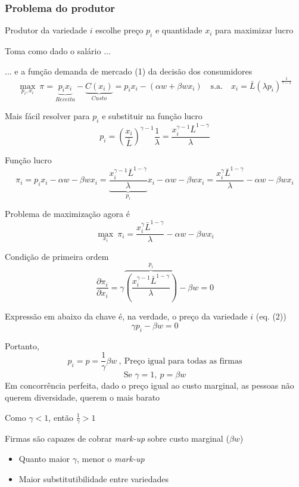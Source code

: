 \documentclass[a4paper,12pt]{article}[abntex2]
\begin{document}
\subsubsection{\textbf{Problema do produtor}}
Produtor da variedade \(i\) escolhe preço \(p_i\) e quantidade \(x_i\) para maximizar lucro

Toma como dado o salário ...

... e a função demanda de mercado (1) da decisão dos consumidores
\[
\max_{p_i, x_i} \ \pi = \underbrace{p_i x_i}_{Receita} - \underbrace{C(x_i)}_{Custo} = p_i x_i - (\alpha w + \beta w x_i)
\quad \text{s.a.} \quad x_i = \bar{L} (\lambda p_i)^{\frac{1}{\gamma - 1}}
\]

Mais fácil resolver para \(p_i\) e substituir na função lucro
\[
p_i = \left( \frac{x_i}{\bar{L}} \right)^{\gamma - 1} \frac{1}{\lambda} = \frac{x_i^{\gamma - 1} \bar{L}^{1 - \gamma}}{\lambda} \tag{2}
\]

Função lucro
\[
\pi_i = p_i x_i - \alpha w - \beta w x_i = \underbrace{\frac{x_i^{\gamma-1} \bar{L}^{1 - \gamma}}{\lambda}}_{p_i}x_i - \alpha w - \beta w x_i=\frac{x_i^{\gamma} \bar{L}^{1 - \gamma}}{\lambda}- \alpha w - \beta w x_i
\]

Problema de maximização agora é
\[
\max_{x_i} \ \pi_i = \frac{x_i^{\gamma} \bar{L}^{1 - \gamma}}{\lambda} - \alpha w - \beta w x_i
\]

Condição de primeira ordem
\[
\frac{\partial \pi_i}{\partial x_i} = \gamma \overbrace {\left( \frac{x_i^{\gamma - 1} \bar{L}^{1 - \gamma}}{\lambda}\right)}^{p_i} - \beta w = 0
\]

Expressão em abaixo da chave é, na verdade, o preço da variedade \(i\) (eq. (2))
\[
\gamma p_i - \beta w = 0
\]

Portanto,
\[
p_i = p = \frac{1}{\gamma} \beta w \tag{3} \ , \ \text{Preço igual para todas as firmas}
\]
\[
\text{Se \(\gamma=1\)}, \ p=\beta w
\]
Em concorrência perfeita, dado o preço igual ao custo marginal, as pessoas não querem diversidade, querem o mais barato

Como \(\gamma < 1\), então \(\frac{1}{\gamma} > 1\)

Firmas são capazes de cobrar \textit{mark-up} sobre custo marginal (\(\beta w\))
\begin{itemize}
    \item Quanto maior \(\gamma\), menor o \textit{mark-up}
    \item Maior substitutibilidade entre variedades
\end{itemize}
\end{document}
